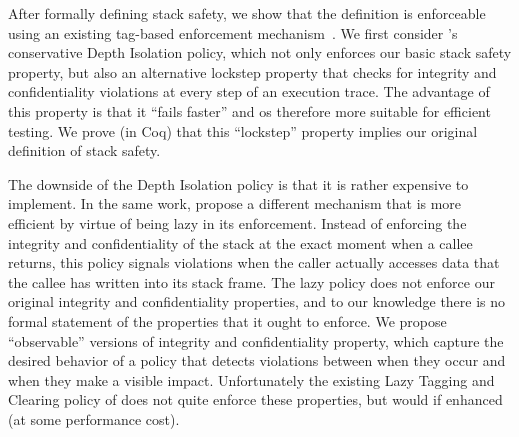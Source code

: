 \documentclass[acmsmall,review,anonymous]{acmart}\settopmatter{printfolios=true,printccs=false,printacmref=false}
\begin{document}
After formally defining stack safety, we show that the definition is
enforceable using an existing tag-based enforcement
mechanism~\citep{DBLP:conf/sp/RoesslerD18}. We first consider
\citeauthor{DBLP:conf/sp/RoesslerD18}'s
conservative Depth Isolation policy, which not only enforces our basic
stack safety property, but also an alternative lockstep property that
checks for integrity and confidentiality violations at every step of
an execution trace. The advantage of this property is that it ``fails
faster'' and os therefore more suitable for efficient testing. We prove (in
Coq) that this ``lockstep'' property implies our original definition of stack
safety.

The downside of the Depth Isolation policy is that it is rather
expensive to implement. In the same work,
\citeauthor{DBLP:conf/sp/RoesslerD18} propose a different mechanism
that is more efficient by virtue of being lazy in its enforcement.
Instead of enforcing the integrity and confidentiality of the stack at the
exact moment
when a callee returns, this policy signals violations when the
caller actually accesses data that the callee has written into its stack
frame\ifaftersubmission{}\fi.
The lazy policy does not enforce our original integrity and confidentiality
properties, and to our knowledge there is no formal statement of the properties that
it ought to enforce. We propose ``observable'' versions of integrity and
confidentiality property, which capture the desired behavior of a policy that
detects violations between when they occur and when they make a visible impact.
Unfortunately the existing Lazy Tagging and Clearing policy of
\citeauthor{DBLP:conf/sp/RoesslerD18} does not quite enforce these properties,
but would if enhanced (at some performance cost).

\end{document}
